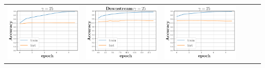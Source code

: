 \begin{minipage}{0.99\columnwidth}
{\begin{tabular}{cccccc}
\includegraphics[scale=0.125]{figs/galu_25_bad_good.pdf}&
\includegraphics[scale=0.125]{figs/relu_25_good.pdf}&
\includegraphics[scale=0.125]{figs/galu_25_recovered.pdf}

\end{tabular}}
\end{minipage}
